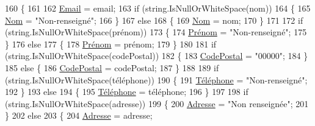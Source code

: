 \begin{DoxyCode}
160         \{
161 
162             \hyperlink{classModele_1_1Utilisateur_a1250bfe957225a47f96f31e5d0c1d305}{Email} = email;
163             \textcolor{keywordflow}{if} (\textcolor{keywordtype}{string}.IsNullOrWhiteSpace(nom))
164             \{
165                 \hyperlink{classModele_1_1Utilisateur_a2aa56cab9101d6c24445d3d6e1a7640d}{Nom} = \textcolor{stringliteral}{"Non-renseigné"};
166             \}
167             \textcolor{keywordflow}{else}
168             \{
169                 \hyperlink{classModele_1_1Utilisateur_a2aa56cab9101d6c24445d3d6e1a7640d}{Nom} = nom;
170             \}
171 
172             \textcolor{keywordflow}{if} (\textcolor{keywordtype}{string}.IsNullOrWhiteSpace(prénom))
173             \{
174                 \hyperlink{classModele_1_1Utilisateur_a8be63c78df8f6d3bbeb8f6ceb7197975}{Prénom} = \textcolor{stringliteral}{"Non-renseigné"};
175             \}
176             \textcolor{keywordflow}{else}
177             \{
178                 \hyperlink{classModele_1_1Utilisateur_a8be63c78df8f6d3bbeb8f6ceb7197975}{Prénom} = prénom;
179             \}
180 
181             \textcolor{keywordflow}{if} (\textcolor{keywordtype}{string}.IsNullOrWhiteSpace(codePostal))
182             \{
183                 \hyperlink{classModele_1_1Utilisateur_a5f92f22eba78e5b4cccccc1936351886}{CodePostal} = \textcolor{stringliteral}{"00000"};
184             \}
185             \textcolor{keywordflow}{else} \{
186                 \hyperlink{classModele_1_1Utilisateur_a5f92f22eba78e5b4cccccc1936351886}{CodePostal} = codePostal;
187             \}
188 
189             \textcolor{keywordflow}{if} (\textcolor{keywordtype}{string}.IsNullOrWhiteSpace(téléphone))
190             \{
191                 \hyperlink{classModele_1_1Utilisateur_ac0addebdc1b4733d0b0447f6a22b81c9}{Téléphone} = \textcolor{stringliteral}{"Non-renseigné"};
192             \}
193             \textcolor{keywordflow}{else}
194             \{
195                 \hyperlink{classModele_1_1Utilisateur_ac0addebdc1b4733d0b0447f6a22b81c9}{Téléphone} = téléphone;
196             \}
197 
198             \textcolor{keywordflow}{if} (\textcolor{keywordtype}{string}.IsNullOrWhiteSpace(adresse))
199             \{
200                 \hyperlink{classModele_1_1Utilisateur_ad757f35a1187212cec5bb285e5a0e0ca}{Adresse} = \textcolor{stringliteral}{"Non renseignée"};
201             \}
202             \textcolor{keywordflow}{else}
203             \{
204                 \hyperlink{classModele_1_1Utilisateur_ad757f35a1187212cec5bb285e5a0e0ca}{Adresse} = adresse;

\end{DoxyCode}
